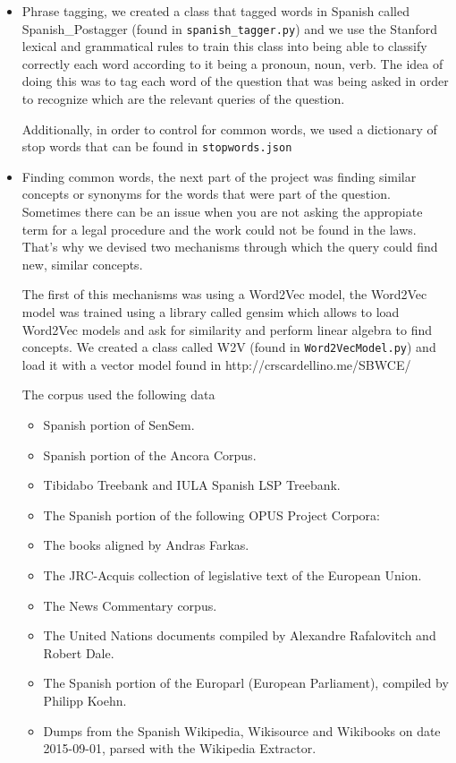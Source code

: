 \documentclass[letterpaper, margin=1in]{article}
\begin{document}
\begin{itemize} 

\item Phrase tagging, we created a class that tagged words in Spanish called Spanish{\_}Postagger (found in \texttt{spanish{\_}tagger.py}) and we use the Stanford lexical and grammatical rules to train this class into being able to classify correctly each word according to it being a pronoun, noun, verb. The idea of doing this was to tag each word of the question that was being asked in order to recognize which are the relevant queries of the question. 

Additionally, in order to control for common words, we used a dictionary of stop words  that can be found in \texttt{stopwords.json}

\item Finding common words, the next part of the project was finding similar
concepts or synonyms for the words that were part of the question. Sometimes
there can be an issue when you are not asking the appropiate term for a legal
procedure and the work could not be found in the laws. That's why we devised
two mechanisms through which the query could find new, similar concepts. 

The first of this mechanisms was using a Word2Vec model, the Word2Vec model
was trained using a library called gensim which allows to load Word2Vec models and ask for similarity and perform linear algebra to find concepts.
We created a class called W2V (found in \texttt{Word2VecModel.py}) and load it with a vector model found in http://crscardellino.me/SBWCE/

The corpus used the following data

\begin{itemize} 
\item Spanish portion of SenSem.
\item Spanish portion of the Ancora Corpus.
\item Tibidabo Treebank and IULA Spanish LSP Treebank.
\item The Spanish portion of the following OPUS Project Corpora:
\item The books aligned by Andras Farkas.
\item The JRC-Acquis collection of legislative text of the European Union.
\item The News Commentary corpus.
\item The United Nations documents compiled by Alexandre Rafalovitch and Robert Dale.
\item The Spanish portion of the Europarl (European Parliament), compiled by Philipp Koehn.
\item Dumps from the Spanish Wikipedia, Wikisource and Wikibooks on date 2015-09-01, parsed with the Wikipedia Extractor.
\end{itemize} 


\end{itemize}
\end{document}
